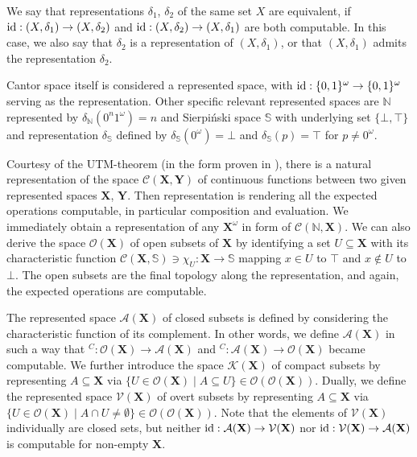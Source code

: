\documentclass{eptcs-modified}
\begin{document}
We say that representations $\delta_1$, $\delta_2$ of the same set $X$ are equivalent, if $\textnormal{id} : (X,\delta_1) \to (X,\delta_2)$ and $\textnormal{id} : (X,\delta_2) \to (X,\delta_1)$ are both computable. In this case, we also say that $\delta_2$ is a representation of $(X,\delta_1)$, or that $(X,\delta_1)$ admits the representation $\delta_2$.

Cantor space itself is considered a represented space, with $\textnormal{id} : {\{0,1\}^\omega} \to {\{0,1\}^\omega}$ serving as the representation. Other specific relevant represented spaces are $\mathbb{N}$ represented by $\delta_\mathbb{N}(0^n1^\omega) = n$ and Sierpi\'nski space $\mathbb{S}$ with underlying set $\{\bot, \top\}$ and representation $\delta_\mathbb{S}$ defined by $\delta_\mathbb{S}(0^\omega) = \bot$ and $\delta_\mathbb{S}(p) = \top$ for $p \neq 0^\omega$.

Courtesy of the UTM-theorem (in the form proven in \cite{weihrauchk}), there is a natural representation of the space $\mathcal{C}(\mathbf{X},\mathbf{Y})$ of continuous functions between two given represented spaces $\mathbf{X}$, $\mathbf{Y}$. Then representation is rendering all the expected operations computable, in particular composition and evaluation. We immediately obtain a representation of any $\mathbf{X}^\omega$ in form of $\mathcal{C}(\mathbb{N},\mathbf{X})$. We can also derive the space $\mathcal{O}(\mathbf{X})$ of open subsets of $\mathbf{X}$ by identifying a set $U \subseteq \mathbf{X}$ with its characteristic function $\mathcal{C}(\mathbf{X},\mathbb{S}) \ni \chi_U : \mathbf{X} \to \mathbb{S}$ mapping $x \in U$ to $\top$ and $x \notin U$ to $\bot$. The open subsets are the final topology along the representation, and again, the expected operations are computable.

The represented space $\mathcal{A}(\mathbf{X})$ of closed subsets is defined
by considering the characteristic function of its complement. In other words, we define $\mathcal{A}(\mathbf{X})$ in such a way that $^C : \mathcal{O}(\mathbf{X}) \to \mathcal{A}(\mathbf{X})$ and $^C : \mathcal{A}(\mathbf{X}) \to \mathcal{O}(\mathbf{X})$ became computable.
We further introduce the space $\mathcal{K}(\mathbf{X})$ of compact subsets by representing $A \subseteq \mathbf{X}$ via $\{U \in \mathcal{O}(\mathbf{X}) \mid A \subseteq U\} \in \mathcal{O}(\mathcal{O}(\mathbf{X}))$.
Dually, we define the represented space $\mathcal{V}(\mathbf{X})$ of
overt subsets by representing $A \subseteq \mathbf{X}$ via $\{U \in \mathcal{O}(\mathbf{X}) \mid A \cap U \ne \emptyset\} \in \mathcal{O}(\mathcal{O}(\mathbf{X}))$. Note that the elements of $\mathcal{V}(\mathbf{X})$ individually are closed sets, but neither $\textnormal{id} : \mathcal{A}(\mathbf{X}) \to \mathcal{V}(\mathbf{X})$ nor $\textnormal{id} : \mathcal{V}(\mathbf{X}) \to \mathcal{A}(\mathbf{X})$ is computable for non-empty $\mathbf{X}$.
\end{document}
